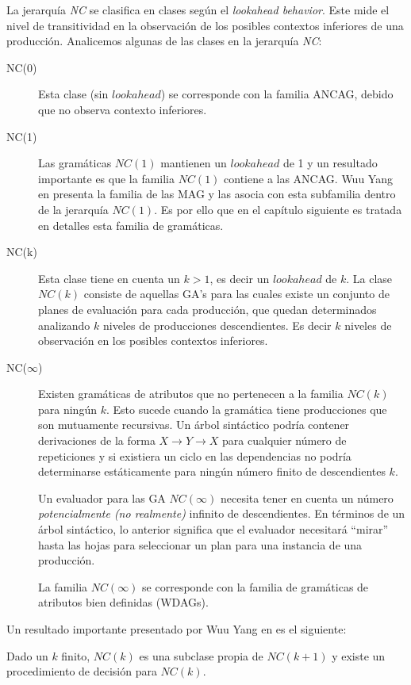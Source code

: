 La jerarquía \emph{NC} se clasifica en clases según el \textit{lookahead behavior}. Este mide el nivel de transitividad en la observación de los posibles contextos inferiores de una producción. Analicemos algunas de las clases en la jerarquía \emph{NC}:
\begin{description}
\item [NC(0)] Esta clase (sin $lookahead$) se corresponde con la familia ANCAG, debido que no observa contexto inferiores. 
\item [NC(1)] Las gramáticas $NC(1)$ mantienen un $lookahead$ de 1 y un resultado importante es que la familia $NC(1)$ contiene a las ANCAG. Wuu Yang en \cite{wuu-yang} presenta la familia de las MAG y las asocia con esta subfamilia dentro de la jerarquía $NC(1)$. Es por ello que en el capítulo siguiente es tratada en detalles esta familia de gramáticas.
\item[NC(k)] Esta clase tiene en cuenta un $k>1$, es decir un $lookahead$ de $k$. La clase $NC(k)$ consiste de aquellas GA's para las cuales existe un conjunto de planes de evaluación para cada producción, que quedan determinados analizando $k$ niveles de producciones descendientes. Es decir $k$ niveles de observación en los posibles contextos inferiores.
\item[NC($\infty$)] Existen gramáticas de atributos que no pertenecen a la familia $NC(k)$ para ningún $k$. Esto sucede cuando la gramática tiene producciones que son mutuamente recursivas. Un árbol sintáctico podría contener derivaciones de la forma $X \rightarrow Y \rightarrow X$ para cualquier número de repeticiones y si existiera un ciclo en las dependencias no podría determinarse estáticamente para ningún número finito de descendientes $k$.

Un evaluador para las GA $NC(\infty)$ necesita tener en cuenta un número \emph{potencialmente (no realmente)} infinito de descendientes. En términos de un árbol sintáctico, lo anterior significa que el evaluador necesitará ``mirar'' hasta las hojas para seleccionar un plan para una instancia de una producción.

\begin{theorem} La familia $NC(\infty)$ se corresponde con la familia de gramáticas de atributos bien definidas (WDAGs).
\end{theorem}
\end{description}

Un resultado importante presentado por Wuu Yang en \cite{wuu-yang2} es el siguiente:
\begin{theorem}
Dado un $k$ finito, $NC(k)$ es una subclase propia de $NC(k+1)$ y existe un procedimiento de decisión para $NC(k)$.
\end{theorem}


